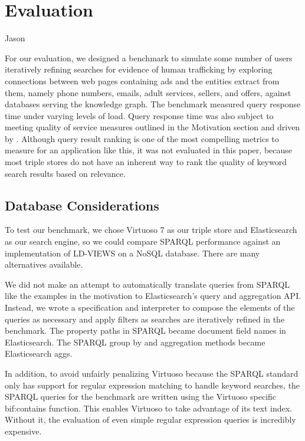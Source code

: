 \section{Evaluation}
\label{sec:evaluation}
Jason



For our evaluation, we designed a benchmark to simulate some number of users iteratively refining searches for evidence of human trafficking by exploring connections between web pages containing ads and the entities extract from them, namely phone numbers, emails, adult services, sellers, and offers, against databases serving the knowledge graph.
The benchmark measured query response time under varying levels of load.
Query response time was also subject to meeting quality of service measures outlined in the Motivation section and driven by \cite{nielsen1994usability}.
Although query result ranking is one of the most compelling metrics to measure for an application like this, it was not evaluated in this paper, because most triple stores do not have an inherent way to rank the quality of keyword search results based on relevance.

\subsection{Database Considerations}
To test our benchmark, we chose Virtuoso 7 as our triple store and Elasticsearch as our search engine, so we could compare SPARQL performance against an implementation of LD-VIEWS on a NoSQL database.  
There are many alternatives available.  

We did not make an attempt to automatically translate queries from SPARQL like the examples in the motivation to Elasticsearch's query and aggregation API.  
Instead, we wrote a specification and interpreter to compose the elements of the queries as necessary and apply filters as searches are iteratively refined in the benchmark.  
The property paths in SPARQL became document field names in Elasticsearch.  
The SPARQL group by and aggregation methods became Elasticsearch aggs. 

In addition, to avoid unfairly penalizing Virtuoso because the SPARQL standard only has support for regular expression matching to handle keyword searches, the SPARQL queries for the benchmark are written using the Virtuoso specific bif:contains function.
This enables Virtuoso to take advantage of its text index.  
Without it, the evaluation of even simple regular expression queries is incredibly expensive.  


